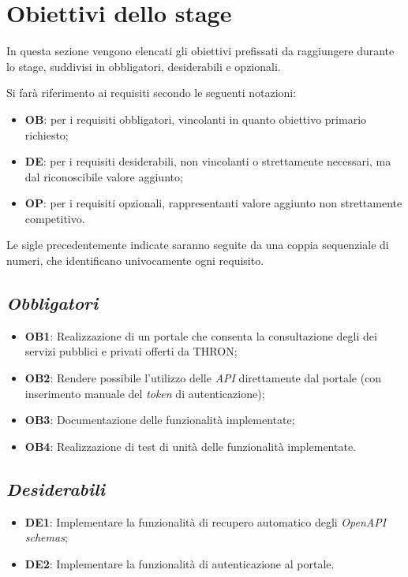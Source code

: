 \section{Obiettivi dello stage}\label{sec:obiettivi-stage}
In questa sezione vengono elencati gli obiettivi prefissati da raggiungere durante lo stage, suddivisi in obbligatori, desiderabili e opzionali.

Si farà riferimento ai requisiti secondo le seguenti notazioni:
\begin{itemize}
    \item \textbf{OB}: per i requisiti obbligatori, vincolanti in quanto obiettivo primario richiesto;
    \item \textbf{DE}: per i requisiti desiderabili, non vincolanti o strettamente necessari, ma dal riconoscibile valore aggiunto;
    \item \textbf{OP}: per i requisiti opzionali, rappresentanti valore aggiunto non strettamente competitivo.
\end{itemize}
Le sigle precedentemente indicate saranno seguite da una coppia sequenziale di numeri, che identificano univocamente ogni requisito.

\subsection*{\emph{Obbligatori}}
\begin{itemize}
    \item \textbf{OB1}: Realizzazione di un portale che consenta la consultazione degli  dei servizi pubblici e privati offerti da THRON;
    \item \textbf{OB2}: Rendere possibile l'utilizzo delle \textit{API} direttamente dal portale (con inserimento manuale del \textit{token} di autenticazione);
    \item \textbf{OB3}: Documentazione delle funzionalità implementate;
    \item \textbf{OB4}: Realizzazione di test di unità delle funzionalità implementate.
\end{itemize}

\subsection*{\emph{Desiderabili}}
\begin{itemize}
    \item \textbf{DE1}: Implementare la funzionalità di recupero automatico degli \textit{OpenAPI schemas};
    \item \textbf{DE2}: Implementare la funzionalità di autenticazione al portale.
\end{itemize}

